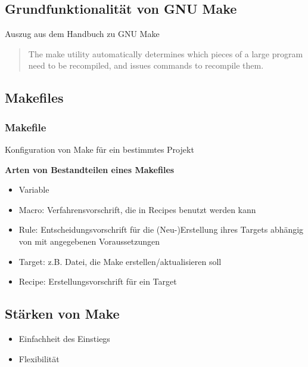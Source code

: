 \subsection{Grundfunktionalität von GNU Make}
\begin{frame}
\cite{GNU_Make_manual} Auszug aus dem Handbuch zu GNU Make
\begin{quote}
The make utility automatically determines which pieces of a large program need to be recompiled, and issues commands to recompile them.
\end{quote}
\end{frame}

\subsection{Makefiles}
\begin{frame}
\frametitle{Makefile} Konfiguration von Make für ein bestimmtes Projekt

\textbf{Arten von Bestandteilen eines Makefiles}
\begin{itemize}
	\item Variable
	\item Macro: Verfahrensvorschrift, die in Recipes benutzt werden kann
	\item Rule: Entscheidungsvorschrift für die (Neu-)Erstellung ihres Targets abhängig von mit angegebenen Voraussetzungen
	\item Target: z.B. Datei, die Make erstellen/aktualisieren soll
	\item Recipe: Erstellungsvorschrift für ein Target
\end{itemize}
\end{frame}

\lstset{language=[gnu]make}
\begin{frame}
\tiny


%
%
\end{frame}

\subsection{Stärken von Make}
\begin{frame}
	\begin{itemize}
		\item Einfachheit des Einstiegs
		\item Flexibilität
	\end{itemize}
\end{frame}

